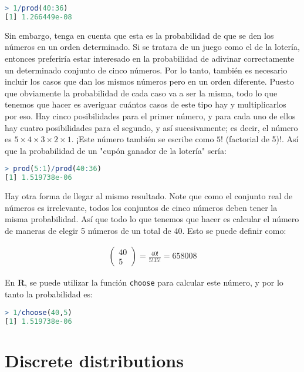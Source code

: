 \begin{lstlisting}[language=R]
> 1/prod(40:36)
[1] 1.266449e-08
\end{lstlisting}

Sin embargo, tenga en cuenta que esta es la probabilidad de que se den los
números en un orden determinado. Si se tratara de un juego como el de la
lotería, entonces preferiría estar interesado en la probabilidad de adivinar
correctamente un determinado conjunto de cinco números.  Por lo tanto, también
es necesario incluir los casos que dan los mismos números pero en un orden
diferente.  Puesto que obviamente la probabilidad de cada caso va a ser la
misma, todo lo que tenemos que hacer es averiguar cuántos casos de este tipo hay
y multiplicarlos por eso. Hay cinco posibilidades para el primer número, y para
cada uno de ellos hay cuatro posibilidades para el segundo, y así sucesivamente;
es decir, el número es $5 \times 4 \times 3 \times 2 \times 1$. ¡Este número
también se escribe como $5!$ (factorial de 5)!. Así que la probabilidad de un
"cupón ganador de la lotería" sería:

\begin{lstlisting}[language=R]
> prod(5:1)/prod(40:36)
[1] 1.519738e-06
\end{lstlisting}

Hay otra forma de llegar al mismo resultado. Note que como el conjunto real de
números es irrelevante, todos los conjuntos de cinco números deben tener la
misma probabilidad. Así que todo lo que tenemos que hacer es calcular el número
de maneras de elegir 5 números de un total de 40. Esto se puede definir como:

\begin{gather*}
\left(
    \begin{array}{c}
      40\\
      5
  \end{array}
\right) = \frac{40!}{5!35!} = 658008
\end{gather*} 

En \textbf{R}, se puede utilizar la función \texttt{choose} para calcular este
número, y por lo tanto la probabilidad es:

\begin{lstlisting}[language=R]
> 1/choose(40,5)
[1] 1.519738e-06
\end{lstlisting}

\section{Discrete distributions}
\newpage
